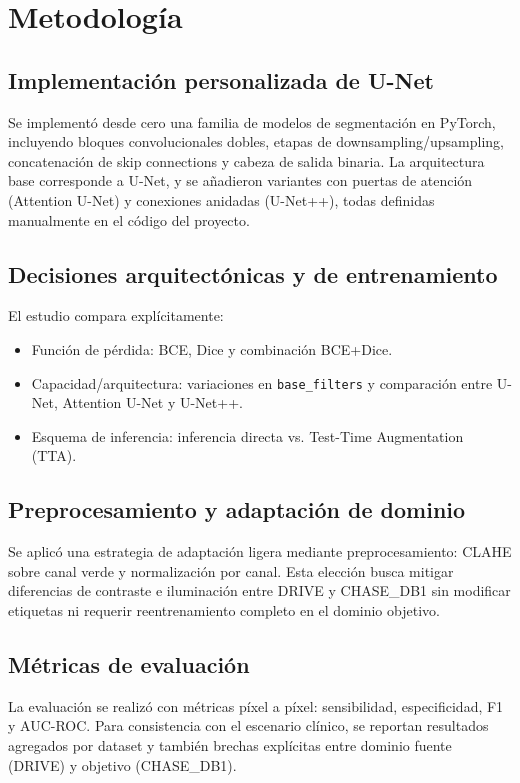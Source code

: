 \section{Metodología}
\subsection{Implementación personalizada de U-Net}
Se implementó desde cero una familia de modelos de segmentación en PyTorch, incluyendo bloques convolucionales dobles, etapas de downsampling/upsampling, concatenación de skip connections y cabeza de salida binaria. La arquitectura base corresponde a U-Net, y se añadieron variantes con puertas de atención (Attention U-Net) y conexiones anidadas (U-Net++), todas definidas manualmente en el código del proyecto.

\subsection{Decisiones arquitectónicas y de entrenamiento}
El estudio compara explícitamente:
\begin{itemize}
    \item Función de pérdida: BCE, Dice y combinación BCE+Dice.
    \item Capacidad/arquitectura: variaciones en \texttt{base\_filters} y comparación entre U-Net, Attention U-Net y U-Net++.
    \item Esquema de inferencia: inferencia directa vs. Test-Time Augmentation (TTA).
\end{itemize}

\subsection{Preprocesamiento y adaptación de dominio}
Se aplicó una estrategia de adaptación ligera mediante preprocesamiento: CLAHE sobre canal verde y normalización por canal. Esta elección busca mitigar diferencias de contraste e iluminación entre DRIVE y CHASE\_DB1 sin modificar etiquetas ni requerir reentrenamiento completo en el dominio objetivo.

\subsection{Métricas de evaluación}
La evaluación se realizó con métricas píxel a píxel: sensibilidad, especificidad, F1 y AUC-ROC. Para consistencia con el escenario clínico, se reportan resultados agregados por dataset y también brechas explícitas entre dominio fuente (DRIVE) y objetivo (CHASE\_DB1).

